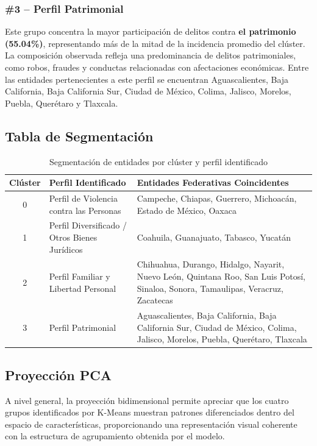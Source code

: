 \subsubsection{\#3 – Perfil Patrimonial}

Este grupo concentra la mayor participación de delitos contra \textbf{el patrimonio (55.04\%)}, representando más de la mitad
de la incidencia promedio del clúster. La composición observada refleja una predominancia de delitos patrimoniales,
como robos, fraudes y conductas relacionadas con afectaciones económicas. Entre las entidades pertenecientes a este
perfil se encuentran Aguascalientes, Baja California, Baja California Sur, Ciudad de México, Colima, Jalisco, Morelos,
Puebla, Querétaro y Tlaxcala.

\subsection{Tabla de Segmentación}

\begin{table}[ht]
\centering
\caption{Segmentación de entidades por clúster y perfil identificado}
\begin{tabular}{c l p{8cm}}
\hline
\textbf{Clúster} & \textbf{Perfil Identificado} & \textbf{Entidades Federativas Coincidentes} \\
\hline
0 & Perfil de Violencia contra las Personas & Campeche, Chiapas, Guerrero, Michoacán, Estado de México, Oaxaca \\
1 & Perfil Diversificado / Otros Bienes Jurídicos & Coahuila, Guanajuato, Tabasco, Yucatán \\
2 & Perfil Familiar y Libertad Personal & Chihuahua, Durango, Hidalgo, Nayarit, Nuevo León, Quintana Roo, San Luis Potosí, Sinaloa, Sonora, Tamaulipas, Veracruz, Zacatecas \\
3 & Perfil Patrimonial & Aguascalientes, Baja California, Baja California Sur, Ciudad de México, Colima, Jalisco, Morelos, Puebla, Querétaro, Tlaxcala \\
\hline
\end{tabular}
\label{tab:cluster-segmentation}
\end{table}

\subsection{Proyección PCA}

A nivel general, la proyección bidimensional permite apreciar que los cuatro grupos identificados por K-Means muestran
patrones diferenciados dentro del espacio de características, proporcionando una representación visual coherente con la
estructura de agrupamiento obtenida por el modelo.

